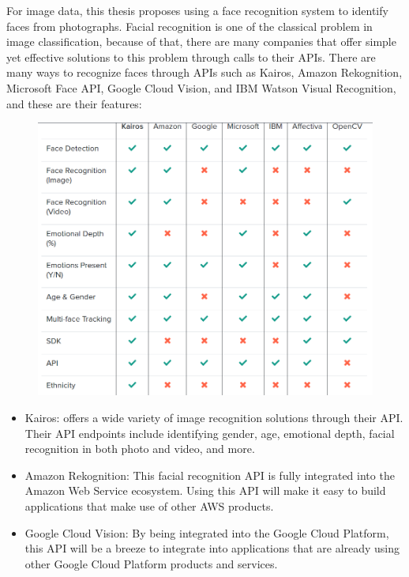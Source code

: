 For image data, this thesis proposes using a face recognition system to identify faces from photographs. Facial recognition is one of the classical problem in image classification, because of that, there are many companies that offer simple yet effective solutions to this problem through calls to their APIs. There are many ways to recognize faces through APIs such as Kairos, Amazon Rekognition, Microsoft Face API, Google Cloud Vision, and IBM Watson Visual Recognition, and these are their features:
\begin{center}
	\begin{figure}[H]
		\centering
		\includegraphics[width=1\columnwidth]{images/chap3/face_api.png}
		\label{chap3:face_api_now}
	\end{figure}
\end{center}
\begin{itemize}
	\item  Kairos: offers a wide variety of image recognition solutions through their API. Their API endpoints include identifying gender, age, emotional depth, facial recognition in both photo and video, and more.
	\item Amazon Rekognition: This facial recognition API is fully integrated into the Amazon Web Service ecosystem. Using this API will make it easy to build applications that make use of other AWS products.
	\item Google Cloud Vision: By being integrated into the Google Cloud Platform, this API will be a breeze to integrate into applications that are already using other Google Cloud Platform products and services.
\end{itemize}

